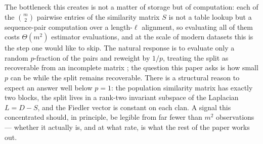 The bottleneck this creates is not a matter of storage but of computation:
each of the $\binom{m}{2}$ pairwise entries of the similarity matrix $S$ is
not a table lookup but a sequence-pair computation over a length-$\ell$
alignment, so evaluating all of them costs $\Theta(m^2)$ estimator
evaluations, and at the scale of modern datasets this is the step one would
like to skip. The natural response is to evaluate only a random
$p$-fraction of the pairs and reweight by $1/p$, treating the split as
recoverable from an incomplete matrix \cite{candes2008exact,
candes2009power, candes2009matrix}; the question this paper asks is how
small $p$ can be while the split remains recoverable. There is a structural
reason to expect an answer well below $p=1$: the population similarity
matrix has exactly two blocks, the split lives in a rank-two invariant
subspace of the Laplacian $L=D-S$, and the Fiedler vector is constant on
each clan. A signal this concentrated should, in principle, be legible from
far fewer than $m^2$ observations --- whether it actually is, and at what
rate, is what the rest of the paper works out.

